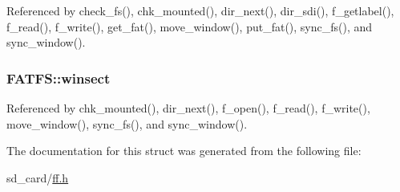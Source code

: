 Referenced by check\-\_\-fs(), chk\-\_\-mounted(), dir\-\_\-next(), dir\-\_\-sdi(), f\-\_\-getlabel(), f\-\_\-read(), f\-\_\-write(), get\-\_\-fat(), move\-\_\-window(), put\-\_\-fat(), sync\-\_\-fs(), and sync\-\_\-window().

\hypertarget{structFATFS_ac60e69c00e6bf7c25febfbac4dc1476b}{
\subsubsection[{winsect}]{ F\-A\-T\-F\-S\-::winsect}}\label{structFATFS_ac60e69c00e6bf7c25febfbac4dc1476b}


Referenced by chk\-\_\-mounted(), dir\-\_\-next(), f\-\_\-open(), f\-\_\-read(), f\-\_\-write(), move\-\_\-window(), sync\-\_\-fs(), and sync\-\_\-window().



The documentation for this struct was generated from the following file\-:\begin{DoxyCompactItemize}
\item 
sd\-\_\-card/\hyperlink{ff_8h}{ff.\-h}\end{DoxyCompactItemize}
